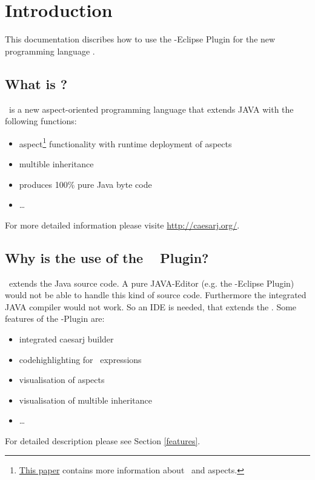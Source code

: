 \section{Introduction}
This documentation discribes how to use the \caesarj -Eclipse Plugin for the new programming language \caesarj.
\subsection{What is \caesarj ?}
\caesar ~is a new aspect-oriented programming language that extends JAVA with the following functions:
\begin{itemize}
	\item aspect\footnote{\href{http://www.st.informatik.tu-darmstadt.de/database/publications/data/aosd03.pdf?id=70}{This paper} contains more information about \caesarj ~and aspects.} functionality with runtime deployment of aspects
	\item multible inheritance
	\item produces 100\% pure Java byte code
	\item \dots
\end{itemize}
For more detailed information please visite \href{http://caesarj.org/}{http://caesarj.org/}.

\subsection{Why is the use of the \caesarj ~ Plugin?}
\caesarj ~extends the Java source code. A pure JAVA-Editor (e.g. the \jdt -Eclipse Plugin) would not be able to handle this kind of source code. Furthermore the integrated JAVA compiler would not work. So an IDE is needed, that extends the \jdt. Some features of the \caesarj -Plugin are:
\begin{itemize}
	\item integrated caesarj builder
	\item codehighlighting for \caesarj ~expressions
	\item visualisation of aspects
	\item visualisation of multible inheritance
	\item \dots
\end{itemize}
For detailed description please see Section \ref{features}.


